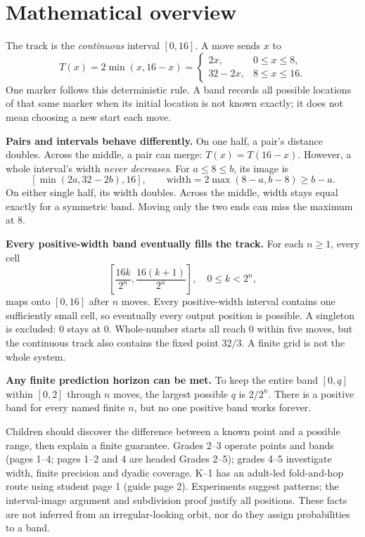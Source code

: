 \documentclass[11pt,letterpaper]{article}
\begin{document}
\section*{Mathematical overview}
The track is the \emph{continuous} interval $[0,16]$. A move sends $x$ to
\[T(x)=2\min(x,16-x)=\begin{cases}2x,&0\le x\le8,\\32-2x,&8\le x\le16.\end{cases}\]
One marker follows this deterministic rule. A band records all possible locations of that same marker when its initial location is not known exactly; it does not mean choosing a new start each move.

\textbf{Pairs and intervals behave differently.} On one half, a pair's distance doubles. Across the middle, a pair can merge: $T(x)=T(16-x)$. However, a whole interval's width \emph{never decreases}. For $a\le8\le b$, its image is
\[ [\min(2a,32-2b),16],\qquad
\text{width}=2\max(8-a,b-8)\ge b-a. \]
On either single half, its width doubles. Across the middle, width stays equal exactly for a symmetric band. Moving only the two ends can miss the maximum at $8$.

\textbf{Every positive-width band eventually fills the track.} For each $n\ge1$, every cell
\[\left[\frac{16k}{2^n},\frac{16(k+1)}{2^n}\right],\quad 0\le k<2^n,\]
maps onto $[0,16]$ after $n$ moves. Every positive-width interval contains one sufficiently small cell, so eventually every output position is possible. A singleton is excluded: $0$ stays at $0$. Whole-number starts all reach $0$ within five moves, but the continuous track also contains the fixed point $32/3$. A finite grid is not the whole system.

\textbf{Any finite prediction horizon can be met.} To keep the entire band $[0,q]$ within $[0,2]$ through $n$ moves, the largest possible $q$ is $2/2^n$. There is a positive band for every named finite $n$, but no one positive band works forever.

Children should discover the difference between a known point and a possible range, then explain a finite guarantee. Grades 2--3 operate points and bands (pages 1--4; pages 1--2 and 4 are headed Grades 2--5); grades 4--5 investigate width, finite precision and dyadic coverage. K--1 has an adult-led fold-and-hop route using student page 1 (guide page 2). Experiments suggest patterns; the interval-image argument and subdivision proof justify all positions. These facts are not inferred from an irregular-looking orbit, nor do they assign probabilities to a band.
\newpage
\end{document}
